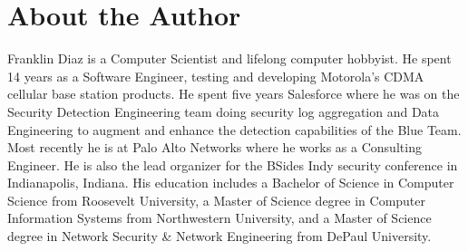 \chapter*{About the Author}
\vspace{5mm}

\justify
Franklin Diaz is a Computer Scientist and lifelong computer hobbyist. He spent 14 years as a Software Engineer, testing and developing Motorola's CDMA cellular base station products. He spent five years Salesforce where he was on the Security Detection Engineering team doing security log aggregation and Data Engineering to augment and enhance the detection capabilities of the Blue Team. Most recently he is at Palo Alto Networks where he works as a Consulting Engineer. He is also the lead organizer for the BSides Indy security conference in Indianapolis, Indiana. His education includes a Bachelor of Science in Computer Science from Roosevelt University, a Master of Science degree in Computer Information Systems from Northwestern University, and a Master of Science degree in Network Security \& Network Engineering from DePaul University.
\vspace{5mm}
